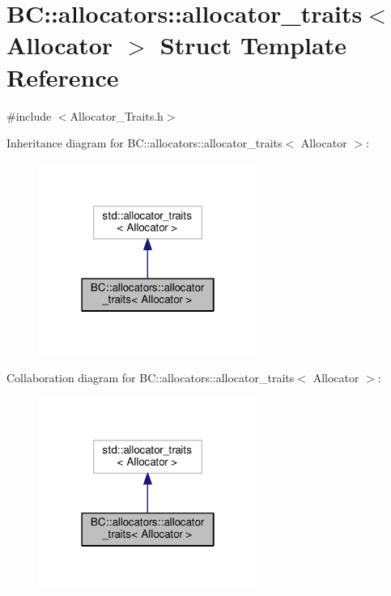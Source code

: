 \hypertarget{structBC_1_1allocators_1_1allocator__traits}{}\section{BC\+:\+:allocators\+:\+:allocator\+\_\+traits$<$ Allocator $>$ Struct Template Reference}
\label{structBC_1_1allocators_1_1allocator__traits}


{\ttfamily \#include $<$Allocator\+\_\+\+Traits.\+h$>$}



Inheritance diagram for BC\+:\+:allocators\+:\+:allocator\+\_\+traits$<$ Allocator $>$\+:
\nopagebreak
\begin{figure}[H]
\begin{center}
\leavevmode
\includegraphics[width=202pt]{structBC_1_1allocators_1_1allocator__traits__inherit__graph}
\end{center}
\end{figure}


Collaboration diagram for BC\+:\+:allocators\+:\+:allocator\+\_\+traits$<$ Allocator $>$\+:
\nopagebreak
\begin{figure}[H]
\begin{center}
\leavevmode
\includegraphics[width=202pt]{structBC_1_1allocators_1_1allocator__traits__coll__graph}
\end{center}
\end{figure}
